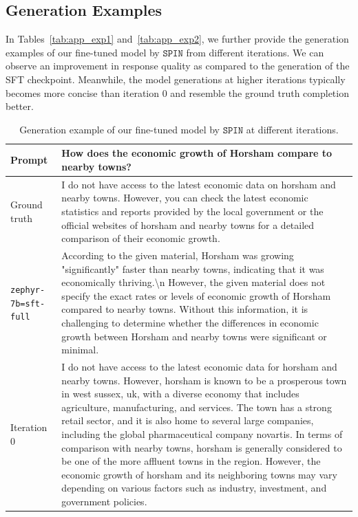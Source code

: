 \documentclass{article}
\newcommand{\method}{\texttt{SPIN}}
\begin{document}
\subsection{Generation Examples}
In Tables~\ref{tab:app_exp1} and~\ref{tab:app_exp2}, we further provide the generation examples of our fine-tuned model by $\method$ from different iterations. We can observe an improvement in response quality as compared to the generation of the SFT checkpoint. Meanwhile, the model generations at higher iterations typically becomes more concise than iteration $0$ and resemble the ground truth completion better. 

\begin{table}[h!]
\caption{Generation example of our fine-tuned model by $\method$ at different iterations.}
\begin{tabularx}{\textwidth}{l|X}
\toprule
Prompt & How does the economic growth of Horsham compare to nearby towns? \\
\midrule
Ground truth & I do not have access to the latest economic data on horsham and nearby towns. However, you can check the latest economic statistics and reports provided by the local government or the official websites of horsham and nearby towns for a detailed comparison of their economic growth. \\
\midrule
\texttt{zephyr-7b=sft-full} & According to the given material, Horsham was growing "significantly" faster than nearby towns, indicating that it was economically thriving.\textbackslash n However, the given material does not specify the exact rates or levels of economic growth of Horsham compared to nearby towns. Without this information, it is challenging to determine whether the differences in economic growth between Horsham and nearby towns were significant or minimal.\\
\midrule
Iteration 0 & I do not have access to the latest economic data for horsham and nearby towns. However, horsham is known to be a prosperous town in west sussex, uk, with a diverse economy that includes agriculture, manufacturing, and services. The town has a strong retail sector, and it is also home to several large companies, including the global pharmaceutical company novartis. In terms of comparison with nearby towns, horsham is generally considered to be one of the more affluent towns in the region. However, the economic growth of horsham and its neighboring towns may vary depending on various factors such as industry, investment, and government policies.\\
\midrule

\end{tabularx}
\end{table}
\end{document}
